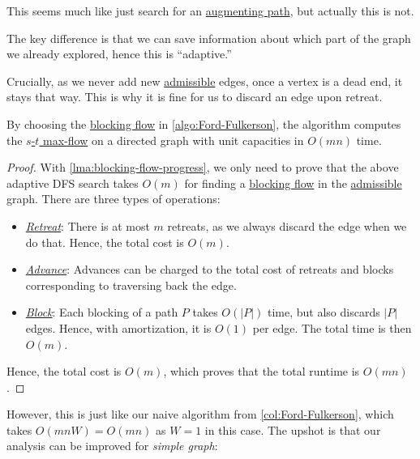 This seems much like just search for an \hyperref[def:augmenting-path]{augmenting path}, but actually this is not.

\begin{intuition}
	The key difference is that we can save information about which part of the graph we already explored, hence this is ``adaptive.''
\end{intuition}

Crucially, as we never add new \hyperref[def:admissible]{admissible} edges, once a vertex is a dead end, it stays that way. This is why it is fine for us to discard an edge upon retreat.

\begin{theorem}\label{thmj:Ford-Fulkerson-blocking-flow-unit}
	By choosing the \hyperref[def:blocking-flow]{blocking flow} in \autoref{algo:Ford-Fulkerson}, the algorithm computes the \hyperref[prb:s-t-max-flow]{\(s\)-\(t\) max-flow} on a directed graph with unit capacities in \(O(mn)\) time.
\end{theorem}
\begin{proof}
	With \autoref{lma:blocking-flow-progress}, we only need to prove that the above adaptive DFS search takes \(O(m)\) for finding a \hyperref[def:blocking-flow]{blocking flow} in the \hyperref[def:admissible]{admissible} graph. There are three types of operations:
	\begin{itemize}
		\item \hyperref[algo:adaptive-DFS-retreat]{\emph{Retreat}}: There is at most \(m\) retreats, as we always discard the edge when we do that. Hence, the total cost is \(O(m)\).
		\item \hyperref[algo:adaptive-DFS-advance]{\emph{Advance}}: Advances can be charged to the total cost of retreats and blocks corresponding to traversing back the edge.
		\item \hyperref[algo:adaptive-DFS-block]{\emph{Block}}: Each blocking of a path \(P\) takes \(O(\lvert P \rvert )\) time, but also discards \(\lvert P \rvert \) edges. Hence, with amortization, it is \(O(1)\) per edge. The total time is then \(O(m)\).
	\end{itemize}
	Hence, the total cost is \(O(m)\), which proves that the total runtime is \(O(mn)\).
\end{proof}

However, this is just like our naive algorithm from \autoref{col:Ford-Fulkerson}, which takes \(O(mnW) = O(mn)\) as \(W = 1\) in this case. The upshot is that our analysis can be improved for \emph{simple graph}:

